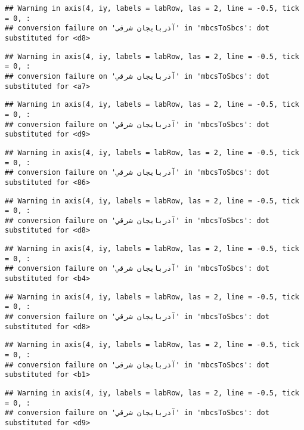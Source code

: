 \documentclass[
]{article}
\begin{document}
\begin{verbatim}
## Warning in axis(4, iy, labels = labRow, las = 2, line = -0.5, tick = 0, :
## conversion failure on 'آذربايجان شرقي' in 'mbcsToSbcs': dot substituted for <d8>
\end{verbatim}

\begin{verbatim}
## Warning in axis(4, iy, labels = labRow, las = 2, line = -0.5, tick = 0, :
## conversion failure on 'آذربايجان شرقي' in 'mbcsToSbcs': dot substituted for <a7>
\end{verbatim}

\begin{verbatim}
## Warning in axis(4, iy, labels = labRow, las = 2, line = -0.5, tick = 0, :
## conversion failure on 'آذربايجان شرقي' in 'mbcsToSbcs': dot substituted for <d9>
\end{verbatim}

\begin{verbatim}
## Warning in axis(4, iy, labels = labRow, las = 2, line = -0.5, tick = 0, :
## conversion failure on 'آذربايجان شرقي' in 'mbcsToSbcs': dot substituted for <86>
\end{verbatim}

\begin{verbatim}
## Warning in axis(4, iy, labels = labRow, las = 2, line = -0.5, tick = 0, :
## conversion failure on 'آذربايجان شرقي' in 'mbcsToSbcs': dot substituted for <d8>
\end{verbatim}

\begin{verbatim}
## Warning in axis(4, iy, labels = labRow, las = 2, line = -0.5, tick = 0, :
## conversion failure on 'آذربايجان شرقي' in 'mbcsToSbcs': dot substituted for <b4>
\end{verbatim}

\begin{verbatim}
## Warning in axis(4, iy, labels = labRow, las = 2, line = -0.5, tick = 0, :
## conversion failure on 'آذربايجان شرقي' in 'mbcsToSbcs': dot substituted for <d8>
\end{verbatim}

\begin{verbatim}
## Warning in axis(4, iy, labels = labRow, las = 2, line = -0.5, tick = 0, :
## conversion failure on 'آذربايجان شرقي' in 'mbcsToSbcs': dot substituted for <b1>
\end{verbatim}

\begin{verbatim}
## Warning in axis(4, iy, labels = labRow, las = 2, line = -0.5, tick = 0, :
## conversion failure on 'آذربايجان شرقي' in 'mbcsToSbcs': dot substituted for <d9>
\end{verbatim}
\end{document}
